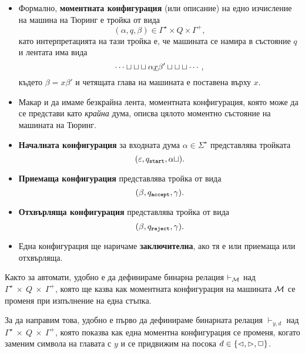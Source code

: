 \begin{itemize}
\item
  Формално, {\bf моментната конфигурация} (или описание) на едно изчисление на машина на Тюринг
  е тройка от вида 
  \[(\alpha, q, \beta) \in \Gamma^\star\times Q \times \Gamma^+,\]
  като интерпретацията на тази тройка е, че машината се намира в състояние $q$ и лентата има вида
  \[\cdots\sqcup\sqcup\sqcup{\alpha\underline{x}\beta'}\sqcup\sqcup\sqcup\cdots,\]
  където $\beta = x\beta'$ и четящата глава на машината е поставена върху $x$.
\item
  Макар и да имаме безкрайна лента, моментната конфигурация, която може да се представи като {\em крайна} дума,
  описва цялото моментно състояние на машината на Тюринг.
\item
  {\bf Началната конфигурация} за входната дума $\alpha \in \Sigma^\star$ представлява тройката
  \[(\varepsilon, q_{\texttt{start}}, \alpha\sqcup).\]
\item
  {\bf Приемаща конфигурация} представлява тройка от вида
  \[(\beta, q_{\texttt{accept}}, \gamma).\]
\item
  {\bf Отхвърляща конфигурация} представлява тройка от вида
  \[(\beta, q_{\texttt{reject}}, \gamma).\]
\item
  Една конфигурация ще наричаме {\bf заключителна}, ако тя е или приемаща или отхвърляща.
\end{itemize}

Както за автомати, удобно е да дефинираме бинарна релация $\vdash_{\mathcal{M}}$ над $\Gamma^\star~\times~Q~\times~\Gamma^+$,
която ще казва как моментната конфигурация на машината $\mathcal{M}$ се променя при изпълнение на една стъпка.


За да направим това, удобно е първо да дефинираме бинарната релация $\vdash_{y,d}$ над $\Gamma^\star~\times~Q~\times~\Gamma^+$, която показва как една моментна конфигурация се променя, когато заменим символа на главата с $y$ и се придвижим на посока $d \in \{\lhd, \rhd, \Box\}$.

